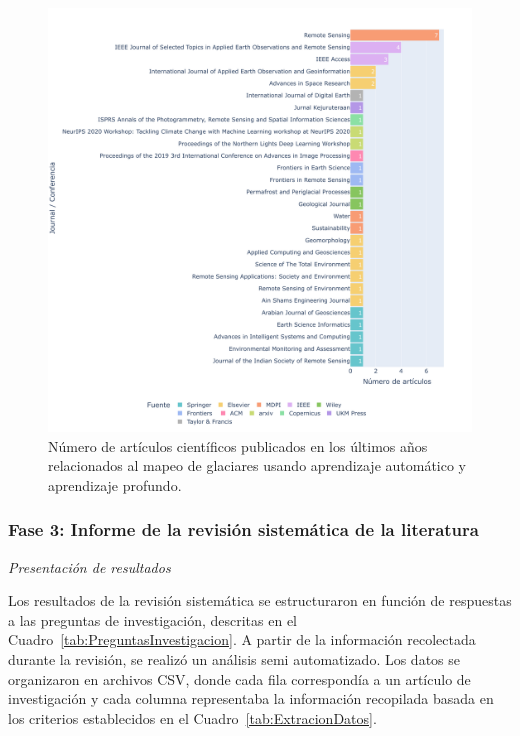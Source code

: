 \begin{figure}[H]
    \begin{center}
    \includegraphics[width=1\textwidth]{Images/ArticuloFuentePublicacion.pdf}
    \end{center}
    \caption{Número de artículos científicos publicados en los últimos años relacionados al mapeo de glaciares usando aprendizaje automático y aprendizaje profundo.}
     \label{fig:ArticuloFuentePublicacion}
\end{figure}

\subsubsection{Fase 3: Informe de la revisión sistemática de la literatura}

\textit{Presentación de resultados}

Los resultados de la revisión sistemática se estructuraron en función de respuestas a las preguntas de investigación, descritas en el Cuadro~\ref{tab:PreguntasInvestigacion}. A partir de la información recolectada durante la revisión, se realizó un análisis semi automatizado. Los datos se organizaron en archivos CSV, donde cada fila correspondía a un artículo de investigación y cada columna representaba la información recopilada basada en los criterios establecidos en el Cuadro~\ref{tab:ExtracionDatos}.

